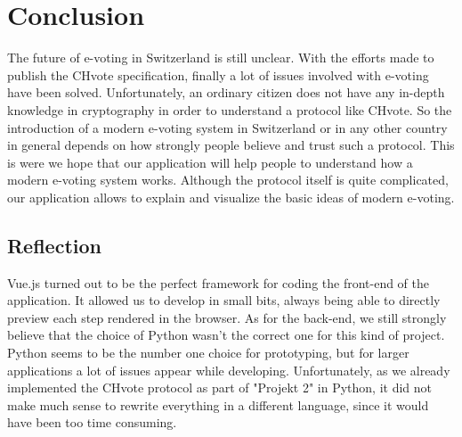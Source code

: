 \chapter{Conclusion}

The future of e-voting in Switzerland is still unclear. With the efforts made
to publish the CHvote specification, finally a lot of issues involved with
e-voting have been solved. Unfortunately, an ordinary citizen does not have any
in-depth knowledge in cryptography in order to understand a protocol like
CHvote. So the introduction of a modern e-voting system in Switzerland or in
any other country in general depends on how strongly people believe and trust
such a protocol. This is were we hope that our application will help people to
understand how a modern e-voting system works. Although the protocol itself is
quite complicated, our application allows to explain and visualize the basic
ideas of modern e-voting.

\section{Reflection}

Vue.js turned out to be the perfect framework for coding the front-end of the
application. It allowed us to develop in small bits, always being able to
directly preview each step rendered in the browser. As for the back-end, we
still strongly believe that the choice of Python wasn't the correct one for
this kind of project. Python seems to be the number one choice for prototyping,
but for larger applications a lot of issues appear while developing.
Unfortunately, as we already implemented the CHvote protocol as part of
"Projekt 2" in Python, it did not make much sense to rewrite everything in a
different language, since it would have been too time consuming.


